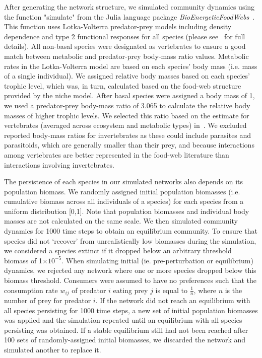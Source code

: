 \documentclass[12pt]{article}
\begin{document}
\begin{spacing}{2.0}
  
    		After generating the network structure, we simulated community dynamics using the function "simulate" from the Julia language package \emph{BioEnergeticFoodWebs}~\citep{bioenergeticfw,Delmas2017}. This function uses Lotka-Volterra predator-prey models including density dependence and type 2 functional responses for all species (please see~\citet{Delmas2017} for full details).
    		All non-basal species were designated as vertebrates to ensure a good match between metabolic and predator-prey body-mass ratio values. Metabolic rates in the Lotka-Volterra model are based on each species' body mass (i.e. mass of a single individual). We assigned relative body masses based on each species' trophic level, which was, in turn, calculated based on the food-web structure provided by the niche model. After basal species were assigned a body mass of 1, we used a predator-prey body-mass ratio of 3.065 to calculate the relative body masses of higher trophic levels. We selected this ratio based on the estimate for vertebrates (averaged across ecosystem and metabolic types) in~\citet{Brose2006}. We excluded reported body-mass ratios for invertebrates as these could include parasites and parasitoids, which are generally smaller than their prey, and because interactions among vertebrates are better represented in the food-web literature than interactions involving invertebrates.
    		
    		
    		The persistence of each species in our simulated networks also depends on its population biomass. 
    		We randomly assigned initial population biomasses (i.e. cumulative biomass across all individuals of a species) for each species from a uniform distribution [0,1]. Note that population biomasses and individual body masses are not calculated on the same scale. We then simulated community dynamics for 1000 time steps to obtain an equilibrium community. To ensure that species did not `recover' from unrealistically low biomasses during the simulation, we considered a species extinct if it dropped below an arbitrary threshold biomass of 1$\times10^{-5}$. When simulating initial (ie. pre-perturbation or equilibrium) dynamics, we rejected any network where one or more species dropped below this biomass threshold. Consumers were assumed to have no preferences such that the consumption rate $w_{ij}$ of predator $i$ eating prey $j$ is equal to $\frac{1}{n}$, where $n$ is the number of prey for predator $i$. If the network did not reach an equilibrium with all species persisting for 1000 time steps, a new set of initial population biomasses was applied and the simulation repeated until an equilibrium with all species persisting was obtained.
    		If a stable equilibrium still had not been reached after 100 sets of randomly-assigned initial biomasses, we discarded the network and simulated another to replace it.
    

\end{spacing}
\end{document}
